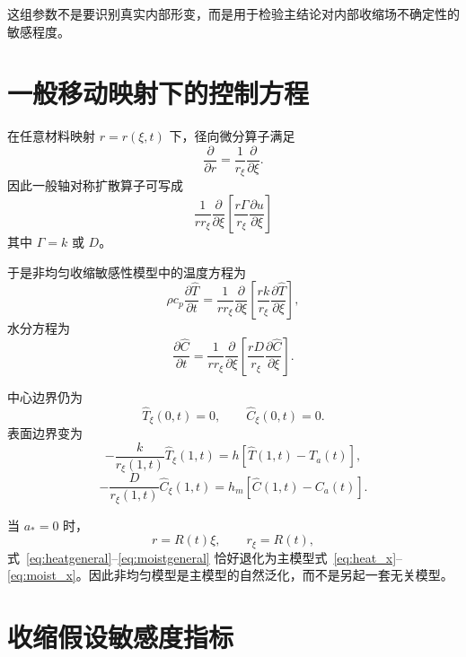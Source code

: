 \documentclass[UTF8,a4paper,12pt]{ctexart}
\begin{document}
这组参数不是要识别真实内部形变，而是用于检验主结论对内部收缩场不确定性的敏感程度。

\section{一般移动映射下的控制方程}

在任意材料映射 $r=r(\xi,t)$ 下，径向微分算子满足
\[
\frac{\partial}{\partial r}
=
\frac{1}{r_\xi}
\frac{\partial}{\partial\xi}.
\]
因此一般轴对称扩散算子可写成
\begin{equation}
\boxed{
\frac{1}{r r_\xi}
\frac{\partial}{\partial\xi}
\left[
\frac{r\Gamma}{r_\xi}
\frac{\partial u}{\partial\xi}
\right]
}
\label{eq:generalop}
\end{equation}
其中 $\Gamma=k$ 或 $D$。

于是非均匀收缩敏感性模型中的温度方程为
\begin{equation}
\rho c_p
\frac{\partial \widehat T}{\partial t}
=
\frac{1}{r r_\xi}
\frac{\partial}{\partial\xi}
\left[
\frac{rk}{r_\xi}
\frac{\partial\widehat T}{\partial\xi}
\right],
\label{eq:heatgeneral}
\end{equation}
水分方程为
\begin{equation}
\frac{\partial \widehat C}{\partial t}
=
\frac{1}{r r_\xi}
\frac{\partial}{\partial\xi}
\left[
\frac{rD}{r_\xi}
\frac{\partial\widehat C}{\partial\xi}
\right].
\label{eq:moistgeneral}
\end{equation}

中心边界仍为
\begin{equation}
\widehat T_\xi(0,t)=0,
\qquad
\widehat C_\xi(0,t)=0.
\end{equation}
表面边界变为
\begin{equation}
-\frac{k}{r_\xi(1,t)}
\widehat T_\xi(1,t)
=
h\left[\widehat T(1,t)-T_a(t)\right],
\label{eq:heatgeneralbc}
\end{equation}
\begin{equation}
-\frac{D}{r_\xi(1,t)}
\widehat C_\xi(1,t)
=
h_m\left[\widehat C(1,t)-C_a(t)\right].
\label{eq:moistgeneralbc}
\end{equation}

当 $a_*=0$ 时，
\[
r=R(t)\xi,
\qquad
r_\xi=R(t),
\]
式~\eqref{eq:heatgeneral}--\eqref{eq:moistgeneral} 恰好退化为主模型式~\eqref{eq:heat_x}--\eqref{eq:moist_x}。因此非均匀模型是主模型的自然泛化，而不是另起一套无关模型。

\section{收缩假设敏感度指标}
\end{document}
